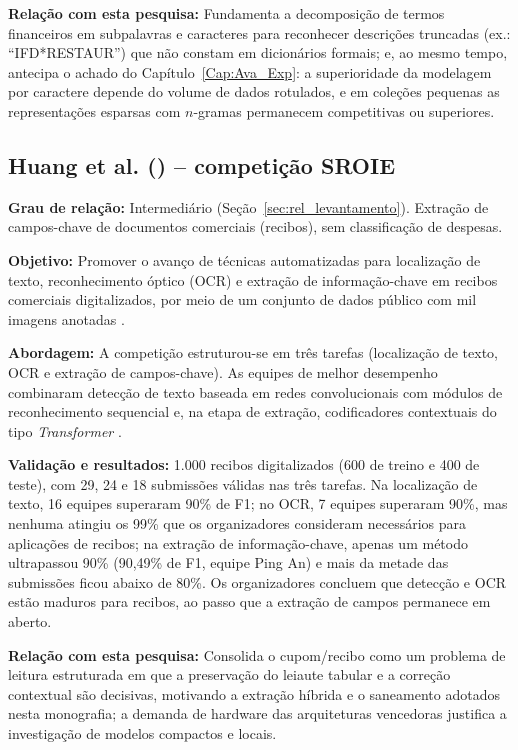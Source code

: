 \textbf{Relação com esta pesquisa:} Fundamenta a decomposição de termos financeiros em subpalavras e caracteres para reconhecer descrições truncadas (ex.: ``IFD*RESTAUR'') que não constam em dicionários formais; e, ao mesmo tempo, antecipa o achado do Capítulo~\ref{Cap:Ava_Exp}: a superioridade da modelagem por caractere depende do volume de dados rotulados, e em coleções pequenas as representações esparsas com $n$-gramas permanecem competitivas ou superiores.

\subsection{Huang et al. (\citeyear{icdar2019competition}) -- competição SROIE}
\textbf{Grau de relação:} Intermediário (Seção~\ref{sec:rel_levantamento}). Extração de campos-chave de documentos comerciais (recibos), sem classificação de despesas.

\textbf{Objetivo:} Promover o avanço de técnicas automatizadas para localização de texto, reconhecimento óptico (OCR) e extração de informação-chave em recibos comerciais digitalizados, por meio de um conjunto de dados público com mil imagens anotadas \cite{icdar2019competition}.

\textbf{Abordagem:} A competição estruturou-se em três tarefas (localização de texto, OCR e extração de campos-chave). As equipes de melhor desempenho combinaram detecção de texto baseada em redes convolucionais com módulos de reconhecimento sequencial e, na etapa de extração, codificadores contextuais do tipo \textit{Transformer} \cite{devlin2019bert}.

\textbf{Validação e resultados:} 1.000 recibos digitalizados (600 de treino e 400 de teste), com 29, 24 e 18 submissões válidas nas três tarefas. Na localização de texto, 16 equipes superaram 90\% de F1; no OCR, 7 equipes superaram 90\%, mas nenhuma atingiu os 99\% que os organizadores consideram necessários para aplicações de recibos; na extração de informação-chave, apenas um método ultrapassou 90\% (90,49\% de F1, equipe Ping An) e mais da metade das submissões ficou abaixo de 80\%. Os organizadores concluem que detecção e OCR estão maduros para recibos, ao passo que a extração de campos permanece em aberto.

\textbf{Relação com esta pesquisa:} Consolida o cupom/recibo como um problema de leitura estruturada em que a preservação do leiaute tabular e a correção contextual são decisivas, motivando a extração híbrida e o saneamento adotados nesta monografia; a demanda de hardware das arquiteturas vencedoras justifica a investigação de modelos compactos e locais.

